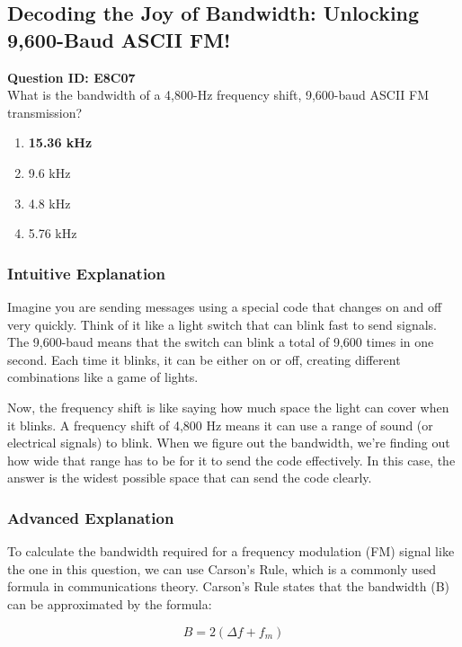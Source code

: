 \subsection{Decoding the Joy of Bandwidth: Unlocking 9,600-Baud ASCII FM!}

\begin{tcolorbox}
\textbf{Question ID: E8C07} \\
What is the bandwidth of a 4,800-Hz frequency shift, 9,600-baud ASCII FM transmission? \\
\begin{enumerate}[label=\Alph*.]
    \item \textbf{15.36 kHz}
    \item 9.6 kHz
    \item 4.8 kHz
    \item 5.76 kHz
\end{enumerate}
\end{tcolorbox}

\subsubsection{Intuitive Explanation}
Imagine you are sending messages using a special code that changes on and off very quickly. Think of it like a light switch that can blink fast to send signals. The 9,600-baud means that the switch can blink a total of 9,600 times in one second. Each time it blinks, it can be either on or off, creating different combinations like a game of lights. 

Now, the frequency shift is like saying how much space the light can cover when it blinks. A frequency shift of 4,800 Hz means it can use a range of sound (or electrical signals) to blink. When we figure out the bandwidth, we're finding out how wide that range has to be for it to send the code effectively. In this case, the answer is the widest possible space that can send the code clearly.

\subsubsection{Advanced Explanation}
To calculate the bandwidth required for a frequency modulation (FM) signal like the one in this question, we can use Carson's Rule, which is a commonly used formula in communications theory. Carson's Rule states that the bandwidth (B) can be approximated by the formula:

\[
B = 2(\Delta f + f_m)
\]

